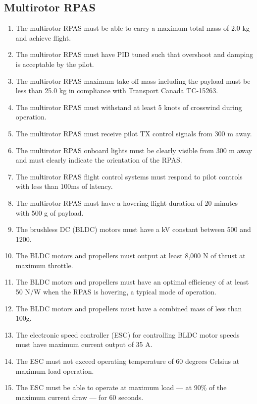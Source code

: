 \documentclass[10pt,letterpaper]{article}
\begin{document}
\subsection{Multirotor RPAS}
\begin{enumerate}[label=NF.DR.\arabic*, wide=1cm, widest=3cm, leftmargin=*, font=\bfseries, noitemsep,topsep=0pt, parsep=4pt, partopsep=0pt]
	\item The multirotor RPAS must be able to carry a maximum total mass of 2.0 kg and achieve flight.
	\item The multirotor RPAS must have PID tuned such that overshoot and damping is acceptable by the pilot.
	\item The multirotor RPAS maximum take off mass including the payload must be less than 25.0 kg in compliance with Transport Canada TC-15263.\cite{tp15263}
	\item The multirotor RPAS must withstand at least 5 knots of crosswind during operation.
	\item The multirotor RPAS must receive pilot TX control signals from 300 m away.
	\item The multirotor RPAS onboard lights must be clearly visible from 300 m away and must clearly indicate the orientation of the RPAS.
	\item The multirotor RPAS flight control systems must respond to pilot controls with less than 100ms of latency.
	\item The multirotor RPAS must have a hovering flight duration of 20 minutes with 500 g of payload.
	\item The brushless DC (BLDC) motors must have a kV constant between 500 and 1200.
	\item The BLDC motors and propellers must output at least 8,000 N of thrust at maximum throttle.
	\item The BLDC motors and propellers must have an optimal efficiency of at least 50 N/W when the RPAS is hovering, a typical mode of operation.
	\item The BLDC motors and propellers must have a combined mass of less than 100g.
	\item The electronic speed controller (ESC) for controlling BLDC motor speeds must have maximum current output of 35 A.
	\item The ESC must not exceed operating temperature of 60 degrees Celsius at maximum load operation.
	\item The ESC must be able to operate at maximum load --- at 90\% of the maximum current draw --- for 60 seconds.

\end{enumerate}
\end{document}
